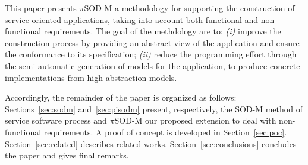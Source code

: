 This paper presents $\pi$SOD-M  a methodology for supporting the construction of service-oriented applications, taking into account both functional and non-functional requirements. The goal of the methdology are to:
\textit{(i)} improve the construction process by providing an abstract view of the application and ensure the conformance to its specification;
\textit{(ii)} reduce the programming effort through the semi-automatic generation of  models for the application, to produce concrete implementations from high abstraction models.


Accordingly, the remainder of the paper is organized as follows:
Sections~\ref{sec:sodm} and~\ref{sec:pisodm} present, respectively, the SOD-M method of service software process and $\pi$SOD-M our proposed extension to deal with non-functional requirements.
A proof of concept  is developed in Section~\ref{sec:poc}. Section~\ref{sec:related} describes related works.
Section~\ref{sec:conclusions} concludes the paper  and gives final remarks.

